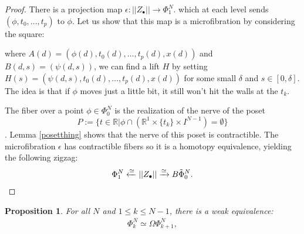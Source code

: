 \documentclass[12pt]{amsart}
\theoremstyle{plain}
\newtheorem{prop}[teo]{Proposition}
\theoremstyle{definition}
\theoremstyle{remark}
\begin{document}
\begin{proof}
There is a projection map $\epsilon: \vert\vert Z_\bullet\vert\vert \rightarrow \Phi_1^N$.
which at each level sends $(\phi,t_0,\dots, t_p)$ to $\phi$. 
Let us show that this map is a microfibration by considering the square:
\begin{center}
\end{center}
where $A(d) = (\phi(d),t_0(d),\dots, t_p(d),x(d))$ and $B(d,s) = (\psi(d,s))$,
we can find a lift $H$ by setting $H(s) = (\psi(d,s),t_0(d),\dots, t_p(d), x(d))$ for some small $\delta$ and $s\in[0,\delta]$. 
The idea is that if $\phi$ moves just a little bit, it still won't hit the walls at the $t_k$.

The fiber over a point $\phi\in\Phi_0^N$ is the realization of the nerve of the poset \[P:= \{t\in\mathbb{R}\vert \phi\cap\left(\mathbb{R}^{1}\times \{t_k\}\times I^{N-1}\right) = \emptyset\}\].
Lemma \ref{posetthing} shows that the nerve of this poset is contractible.
The microfibration $\epsilon$ has contractible fibers so it is a homotopy equivalence, yielding the following zigzag:
\[\Phi_1^N \xleftarrow{\simeq} \vert\vert Z_\bullet\vert\vert \xrightarrow{\simeq} B\tilde{\Phi}_0^N.\qedhere\]
\end{proof}


\begin{prop}\label{higherdelooping}
For all $N$ and $1\leq k \leq N-1$, there is a weak equivalence:
\begin{align}
\Phi_k^N \simeq \Omega \Phi_{k+1}^N,
\end{align}
\end{prop}
\end{document}
